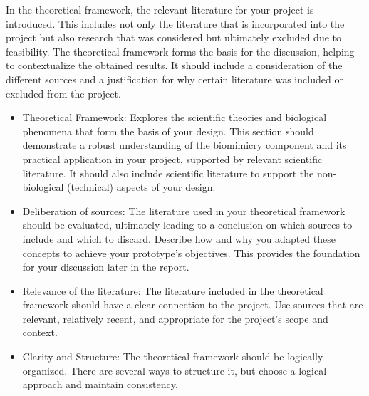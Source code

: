In the theoretical framework, the relevant literature for your project is introduced. This includes not only the literature that is incorporated into the project but also research that was considered but ultimately excluded due to feasibility. The theoretical framework forms the basis for the discussion, helping to contextualize the obtained results. It should include a consideration of the different sources and a justification for why certain literature was included or excluded from the project.

\begin{itemize}
    \item Theoretical Framework: Explores the scientific theories and biological phenomena that form the basis of your design. This section should demonstrate a robust understanding of the biomimicry component and its practical application in your project, supported by relevant scientific literature. It should also include scientific literature to support the non-biological (technical) aspects of your design.
    \item Deliberation of sources: The literature used in your theoretical framework should be evaluated, ultimately leading to a conclusion on which sources to include and which to discard. Describe how and why you adapted these concepts to achieve your prototype's objectives. This provides the foundation for your discussion later in the report.
    \item Relevance of the literature: The literature included in the theoretical framework should have a clear connection to the project. Use sources that are relevant, relatively recent, and appropriate for the project’s scope and context.
    \item Clarity and Structure: The theoretical framework should be logically organized. There are several ways to structure it, but choose a logical approach and maintain consistency.
\end{itemize}
